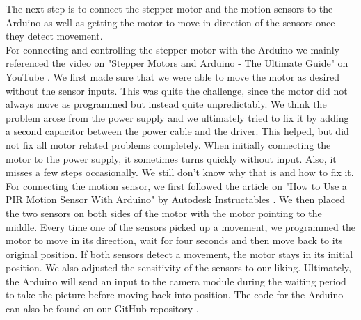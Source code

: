 \documentclass{article}
\begin{document}
The next step is to connect the stepper motor and the motion sensors to the Arduino as well as getting the motor to move in direction of the sensors once they detect movement. \\
For connecting and controlling the stepper motor with the Arduino we mainly referenced the video on "Stepper Motors and Arduino - The Ultimate Guide" on YouTube \cite{motor_video}. We first made sure that we were able to move the motor as desired without the sensor inputs. This was quite the challenge, since the motor did not always move as programmed but instead quite unpredictably. We think the problem arose from the power supply and we ultimately tried to fix it by adding a second capacitor between the power cable and the driver. This helped, but did not fix all motor related problems completely. When initially connecting the motor to the power supply, it sometimes turns quickly without input. Also, it misses a few steps occasionally. We still don't know why that is and how to fix it.\\
For connecting the motion sensor, we first followed the article on "How to Use a PIR Motion Sensor With Arduino" by Autodesk Instructables \cite{motio_sensor_guide}. We then placed the two sensors on both sides of the motor with the motor pointing to the middle. Every time one of the sensors picked up a movement, we programmed the motor to move in its direction, wait for four seconds and then move back to its original position. If both sensors detect a movement, the motor stays in its initial position. We also adjusted the sensitivity of the sensors to our liking. Ultimately, the Arduino will send an input to the camera module during the waiting period to take the picture before moving back into position. The code for the Arduino can also be found on our GitHub repository \cite{github}. 
\end{document}
